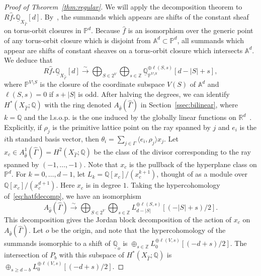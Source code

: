 \documentclass[11pt]{article}
\theoremstyle{definition}
\numberwithin{equation}{section}
\numberwithin{equation}{section}
\begin{document}
\begin{proof}[Proof of Theorem~\ref{thm:regular}]
We will apply the decomposition theorem to $R\hat{f}_* \underline{\mathbb{Q}}_{X_{\hat{\Gamma}}}[d]$. By~\cite[Theorem 5.1]{deCataldoMiglioriniMustata18}, the summands which appears are shifts of the constant sheaf on torus-orbit closures in $\mathbb{P}^d$. Because $\hat{f}$ is an isomorphism over the generic point of any torus-orbit closure which is disjoint from $\mathbb{A}^d \subset \mathbb{P}^d$, all summands which appear are shifts of constant sheaves on a torus-orbit closure which intersects $\mathbb{A}^d$. We deduce that
\begin{equation}\label{eq:hatfdecomp}
R\hat{f}_* \underline{\mathbb{Q}}_{X_{\hat{\Gamma}}}[d] \stackrel{\sim}{\to} \bigoplus_{S \in 2^V} \bigoplus_{s \in \mathbb{Z}} \underline{\mathbb{Q}}_{\mathbb{P}^{V \setminus S}}^{\oplus \ell(S, s)}[d - |S| + s],
\end{equation}
where $\mathbb{P}^{V \setminus S}$ is the closure of the coordinate subspace $V(S)$ of $\mathbb{A}^d$ and $\ell(S, s) = 0$ if $s + |S|$ is odd. After halving the degrees, we can identify $H^*(X_{\hat{\Gamma}}; \mathbb{Q})$ with the ring denoted $A_{\hat{\theta}}(\hat{\Gamma})$ in Section~\ref{ssec:bilinear}, where $k=\mathbb{Q}$ and the l.s.o.p. is the one induced by the globally linear functions on $\mathbb{R}^d$~\cite[Section 5.2]{Fulton}. Explicitly, if $\rho_j$ is the primitive lattice point on the ray spanned by $j$ and $e_i$ is the $i$th standard basis vector, then $\theta_i = \sum_{j \in \Gamma} \langle e_i, \rho_j \rangle x_j$. Let $x_c \in A_{\hat{\theta}}^1(\hat{\Gamma}) = H^2(X_{\hat{\Gamma}}; \mathbb{Q})$ be the class of the divisor corresponding to the ray spanned by $(-1, \dotsc, -1)$. Note that $x_c$ is the pullback of the hyperplane class on $\mathbb{P}^d$. For $k=0, \dotsc, d-1$, let $L_k = \mathbb{Q}[x_c]/(x_c^{k+1})$,  thought of as a module over $\mathbb{Q}[x_c]/(x_c^{d+1})$. Here $x_c$ is in degree $1$. 
Taking the hypercohomology of~\eqref{eq:hatfdecomp}, we have an isomorphism
$$A_{\hat{\theta}}(\hat{\Gamma}) \stackrel{\sim}{\to} \bigoplus_{S \in 2^V} \bigoplus_{s \in \mathbb{Z}} L_{d - |S|}^{\oplus \ell(S, s)}[(- |S| + s)/2].$$
This decomposition gives the Jordan block decomposition of the action of $x_c$ on $A_{\hat{\theta}}(\hat{\Gamma})$. Let $o$ be the origin, and note that the hypercohomology of the summands isomorphic to a shift of $\underline{\mathbb{Q}}_{o}$ is $\oplus_{s \in \mathbb{Z}} L_0^{\oplus \ell(V, s)}[(- d + s)/2]$. The intersection of $P_b$ with this subspace of $H^*(X_{\hat{\Gamma}}; \mathbb{Q})$ is $\oplus_{s \ge d - b} L_0^{\oplus \ell(V, s)}[(- d + s)/2]$.

\end{proof}
\end{document}
